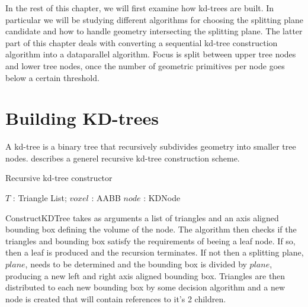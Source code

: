 In the rest of this chapter, we will first examine how kd-trees are
built. In particular we will be studying different algorithms for
choosing the splitting plane candidate and how to handle geometry
intersecting the splitting plane. The latter part of this chapter
deals with converting a sequential kd-tree construction algorithm into
a dataparallel algorithm. Focus is split between upper tree nodes and
lower tree nodes, once the number of geometric primitives per node
goes below a certain threshold.

\section{Building KD-trees}

A kd-tree is a binary tree that recursively subdivides geometry into
smaller tree nodes.  describes a generel
recursive kd-tree construction scheme.

\begin{algorithm}
  \caption{Recursive kd-tree constructor}
  \label{alg:kdTreeCreator}
  \begin{algorithmic}
              {$T$ : Triangle List; $voxel$ : AABB}
              {$node$ : KDNode}
              {
                \ELSE
                \ENDIF}
  \end{algorithmic}
\end{algorithm}

ConstructKDTree takes as arguments a list of triangles and an axis
aligned bounding box defining the volume of the node. The algorithm
then checks if the triangles and bounding box satisfy the requirements
of beeing a leaf node. If so, then a leaf is produced and the
recursion terminates. If not then a splitting plane, $plane$, needs to
be determined and the bounding box is divided by $plane$, producing a
new left and right axis aligned bounding box. Triangles are then
distributed to each new bounding box by some decision algorithm and a
new node is created that will contain references to it's 2 children.

